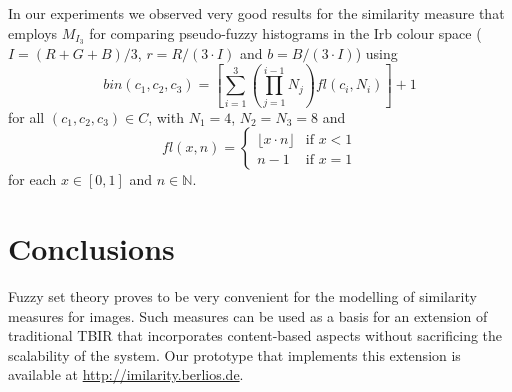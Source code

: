 \documentclass[twocolumn]{phdsymp} %
\begin{document}
In our experiments we observed very good results for the similarity measure that employs
$M_{I_3}$ \cite{vanderweken:similariteitsmaten}
for comparing pseudo-fuzzy histograms in the Irb colour space ($I = (R+G+B)/3$, 
$r=R/(3\cdot I)$ and $b=B/(3\cdot I)$) using
\begin{displaymath}
bin(c_1,c_2,c_3)=\left[ \sum_{i=1}^3 \left( \prod_{j=1}^{i-1} N_j \right) \mathit{fl}(c_i, N_i) \right] 
+ 1
\end{displaymath}
for all $(c_1,c_2,c_3) \in C$, with
$N_1=4$, $N_2=N_3=8$ and
\begin{displaymath}
\mathit{fl}(x,n) = \begin{cases}
\lfloor x \cdot n \rfloor & \text{if } x < 1 \\ 
n - 1 & \text{if } x = 1
\end{cases}
\end{displaymath}
for each $x \in [0,1]$ and $n \in \mathbb{N}$.

\section{Conclusions}
Fuzzy set theory proves to be very convenient for the mo\-del\-ling of similarity measures
for images. Such measures can be used as a basis for an extension of traditional TBIR
that incorporates content-based aspects without sacrificing the scalability of the system.
Our prototype that implements this extension is available at 
\url{http://imilarity.berlios.de}. 

\nocite{*}

 
\end{document}
